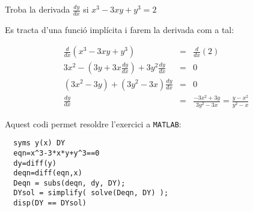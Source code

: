 \Exercise Troba la derivada $\frac{dy}{dx}$ si $x^3-3xy+y^3=2$
\label{ex:derivada1}
\Answer


Es tracta d'una funció implícita i farem la derivada com a tal:

\begin{eqnarray*}
  \frac{d}{dx}(x^3-3xy+y^3)&=&\frac{d}{dx}(2)\\
  3x^2-(3y+3x\frac{dy}{dx})+3y^2\frac{dy}{dx}&=&0\\
  (3x^2-3y)+(3y^2-3x)\frac{dy}{dx}&=&0\\
  \frac{dy}{dx}&=&\frac{-3x^2+3y}{3y^2-3x}=\frac{y-x^2}{y^2-x}
\end{eqnarray*}

Aquest codi permet resoldre l'exercici a \texttt{MATLAB}:
\begin{lstlisting}[style=Matlab-editor]
  % resolució exercici
  syms y(x) DY
  eqn=x^3-3*x*y+y^3==0
  dy=diff(y)
  deqn=diff(eqn,x)
  Deqn = subs(deqn, dy, DY);
  DYsol = simplify( solve(Deqn, DY) );
  disp(DY == DYsol)
  \end{lstlisting}

\blacksquare 